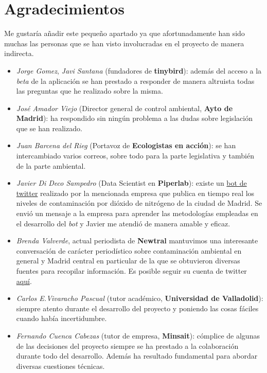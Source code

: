 \section{Agradecimientos}\label{reconocimientos}
Me gustaría añadir este pequeño apartado ya que afortunadamente han sido muchas las personas que se han visto involucradas en el proyecto de manera indirecta. 
\begin{itemize}
	\item \textit{Jorge Gomez}, \textit{Javi Santana} (fundadores de \textbf{tinybird}): además del acceso a la \textit{beta} de la aplicación se han prestado a responder de manera altruista todas las preguntas que he realizado sobre la misma.
	\item \textit{José Amador Viejo} (Director general de control ambiental, \textbf{Ayto de Madrid}): ha respondido sin ningún problema a las dudas sobre legislación que se han realizado.
	\item \textit{Juan Barcena del Rieg} (Portavoz de \textbf{Ecologistas en acción}): se han intercambiado varios correos, sobre todo para la parte legislativa y también de la parte ambiental.
	\item \textit{Javier Di Deco Sampedro} (Data Scientist en \textbf{Piperlab}): existe un \href{https://twitter.com/datoxnitro_bot}{bot de twitter} realizado por la mencionada empresa que publica en tiempo real los niveles de contaminación por dióxido de nitrógeno de la ciudad de Madrid. Se envió un mensaje a la empresa para aprender las metodologías empleadas en el desarrollo del \textit{bot} y Javier me atendió de manera amable y eficaz.
	\item \textit{Brenda Valverde}, actual periodista de \textbf{Newtral} mantuvimos una interesante conversación de carácter periodístico sobre contaminación ambiental en general y Madrid central en particular de la que se obtuvieron diversas fuentes para recopilar información. Es posible seguir su cuenta de twitter \href{https://twitter.com/brbrebren}{aquí}.
	\item \textit{Carlos E.Vivaracho Pascual} (tutor académico, \textbf{Universidad de Valladolid}): siempre atento durante el desarrollo del proyecto y poniendo las cosas fáciles cuando había incertidumbre.
    \item \textit{Fernando Cuenca Cabezas} (tutor de empresa, \textbf{Minsait}): cómplice de algunas de las decisiones del proyecto siempre se ha prestado a la colaboración durante todo del desarrollo. Además ha resultado fundamental para abordar diversas cuestiones técnicas.
\end{itemize}

